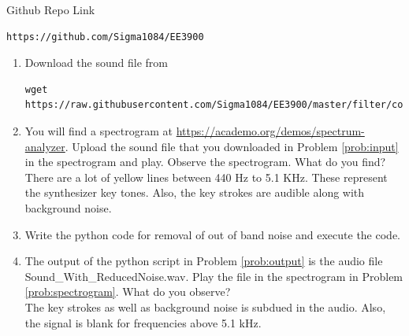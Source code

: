 \documentclass[journal,12pt,twocolumn]{IEEEtran}
\renewcommand\thesection{\arabic{section}}
\begin{document}
\noindent Github Repo Link
\begin{lstlisting}
https://github.com/Sigma1084/EE3900
\end{lstlisting}

\begin{enumerate}[label=\thesection.\arabic*
,ref=\thesection.\theenumi]
\item
\label{prob:input}
Download the sound file from  
\begin{lstlisting}
wget https://raw.githubusercontent.com/Sigma1084/EE3900/master/filter/code/Sound_Noise.wav
\end{lstlisting}

\item
\label{prob:spectrogram}
You will find a spectrogram at \href{https://academo.org/demos/spectrum-analyzer}{\url{https://academo.org/demos/spectrum-analyzer}}. 
%
Upload the sound file that you downloaded in Problem \ref{prob:input} in the spectrogram  and play.  Observe the spectrogram. What do you find?
\\
%
\solution There are a lot of yellow lines between 440 Hz to 5.1 KHz.  These represent the synthesizer key tones. Also, the key strokes
are audible along with background noise.
\item
\label{prob:output}
Write the python code for removal of out of band noise and execute the code.
\\
\solution

%
\item
The output of the python script in Problem \ref{prob:output} is the audio file Sound\_With\_ReducedNoise.wav. Play the file in the spectrogram in Problem \ref{prob:spectrogram}. What do you observe?
\\
\solution The key strokes as well as background noise is subdued in the audio.  Also,  the signal is blank for frequencies above 5.1 kHz.

\end{enumerate}
\end{document}
